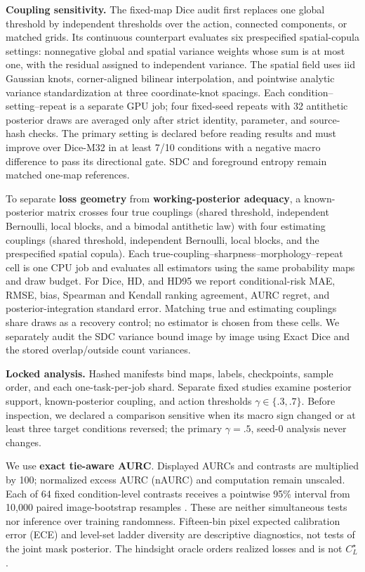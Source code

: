 \noindent\textbf{Coupling sensitivity.}
The fixed-map Dice audit first replaces one global threshold by independent
thresholds over the action, connected components, or matched grids. Its
continuous counterpart evaluates six prespecified spatial-copula settings:
nonnegative global and spatial variance weights whose sum is at most one, with
the residual assigned to independent variance. The spatial field uses iid
Gaussian knots, corner-aligned bilinear interpolation, and pointwise analytic
variance standardization at three coordinate-knot spacings. Each
condition--setting--repeat is a separate
GPU job; four fixed-seed repeats with 32 antithetic posterior draws are averaged
only after strict identity, parameter, and source-hash checks. The primary
setting is declared before reading results and must improve over Dice-M32 in at
least 7/10 conditions with a negative macro difference to pass its directional
gate. SDC and foreground entropy remain matched one-map references.

To separate \textbf{loss geometry} from \textbf{working-posterior adequacy},
a known-posterior matrix crosses four true couplings (shared threshold,
independent Bernoulli, local blocks, and a bimodal antithetic law) with four
estimating couplings (shared threshold, independent Bernoulli, local blocks,
and the prespecified spatial copula). Each true-coupling--sharpness--morphology--repeat
cell is one CPU job and evaluates all estimators using the same probability
maps and draw budget. For Dice, HD, and HD95 we report conditional-risk MAE,
RMSE, bias, Spearman and Kendall ranking agreement, AURC regret, and
posterior-integration standard error. Matching true and estimating couplings
share draws as a recovery control; no estimator is chosen from these cells.
We separately audit the SDC variance bound image by image using Exact Dice and
the stored overlap/outside count variances.

\noindent\textbf{Locked analysis.}
Hashed manifests bind maps, labels, checkpoints, sample order, and each
one-task-per-job shard. Separate fixed studies examine posterior support,
known-posterior coupling, and action thresholds \(\gamma\in\{.3,.7\}\). Before
inspection, we declared a comparison sensitive when its macro sign changed or
at least three target conditions reversed; the primary \(\gamma=.5\), seed-0
analysis never changes.

We use \textbf{exact tie-aware AURC}. Displayed AURCs and contrasts are multiplied by
100; normalized excess AURC (nAURC) and computation remain unscaled. Each of 64 fixed condition-level
contrasts receives a pointwise 95\% interval from 10,000 paired image-bootstrap
resamples \citep{efron1993}. These are neither simultaneous tests nor inference
over training randomness. Fifteen-bin pixel expected calibration error (ECE)
and level-set ladder diversity are descriptive diagnostics, not tests of the
joint mask posterior. The hindsight oracle orders realized losses and is not
\(C_L^\star\).
